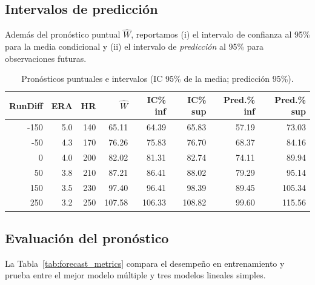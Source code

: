 \documentclass[man,floatsintext]{apa7}
\begin{document}
\subsection{Intervalos de predicción}
Además del pronóstico puntual $\hat{W}$, reportamos (i) el intervalo de confianza al 95\% para la media condicional y (ii) el intervalo de \emph{predicción} al 95\% para observaciones futuras.

\begin{table}[H]
    \centering
    \caption{Pronósticos puntuales e intervalos (IC 95\% de la media; predicción 95\%).}
    \label{tab:pred_intervals_multi}
    \begin{tabular}{rrrrrrrr}
        \toprule
        RunDiff & ERA & HR & $\hat{W}$ & IC\;95\% inf & IC\;95\% sup & Pred.\;95\% inf & Pred.\;95\% sup \\
        \midrule
        -150 & 5.0 & 140 & 65.11 & 64.39 & 65.83 & 57.19 & 73.03 \\
         -50 & 4.3 & 170 & 76.26 & 75.83 & 76.70 & 68.37 & 84.16 \\
           0 & 4.0 & 200 & 82.02 & 81.31 & 82.74 & 74.11 & 89.94 \\
          50 & 3.8 & 210 & 87.21 & 86.41 & 88.02 & 79.29 & 95.14 \\
         150 & 3.5 & 230 & 97.40 & 96.41 & 98.39 & 89.45 & 105.34 \\
         250 & 3.2 & 250 & 107.58 & 106.33 & 108.82 & 99.60 & 115.56 \\
        \bottomrule
    \end{tabular}
\end{table}
\subsection{Evaluación del pronóstico}
La Tabla~\ref{tab:forecast_metrics} compara el desempeño en entrenamiento y prueba entre el mejor modelo múltiple y tres modelos lineales simples.
\end{document}
